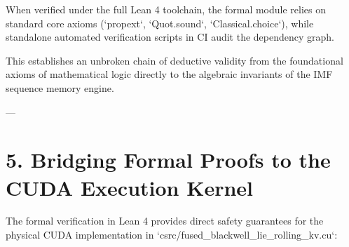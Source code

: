 \documentclass[11pt,twoside,openright]{amsbook}
\begin{document}
{{{{{{When verified under the full Lean 4 toolchain, the formal module relies on standard core axioms (`propext`, `Quot.sound`, `Classical.choice`), while standalone automated verification scripts in CI audit the dependency graph.

This establishes an unbroken chain of deductive validity from the foundational axioms of mathematical logic directly to the algebraic invariants of the IMF sequence memory engine.

---

\section{5. Bridging Formal Proofs to the CUDA Execution Kernel}

The formal verification in Lean 4 provides direct safety guarantees for the physical CUDA implementation in `csrc/fused_blackwell_lie_rolling_kv.cu`:

}}}}}}
\end{document}
